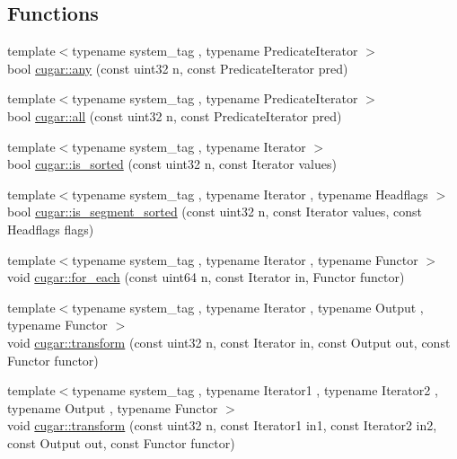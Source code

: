 \subsection*{Functions}
\begin{DoxyCompactItemize}
\item 
{\footnotesize template$<$typename system\+\_\+tag , typename Predicate\+Iterator $>$ }\\bool \hyperlink{group___primitives_ga71416af3e5407b31c78a10026520dbed}{cugar\+::any} (const uint32 n, const Predicate\+Iterator pred)
\item 
{\footnotesize template$<$typename system\+\_\+tag , typename Predicate\+Iterator $>$ }\\bool \hyperlink{group___primitives_gaa98aa06ec6a5f38dda15d74ce0c47d57}{cugar\+::all} (const uint32 n, const Predicate\+Iterator pred)
\item 
{\footnotesize template$<$typename system\+\_\+tag , typename Iterator $>$ }\\bool \hyperlink{group___primitives_gaec6f4aab196d418865686901c11a093c}{cugar\+::is\+\_\+sorted} (const uint32 n, const Iterator values)
\item 
{\footnotesize template$<$typename system\+\_\+tag , typename Iterator , typename Headflags $>$ }\\bool \hyperlink{group___primitives_ga5e6eb75d00ed617295bcee0b1db0ee3e}{cugar\+::is\+\_\+segment\+\_\+sorted} (const uint32 n, const Iterator values, const Headflags flags)
\item 
{\footnotesize template$<$typename system\+\_\+tag , typename Iterator , typename Functor $>$ }\\void \hyperlink{group___primitives_ga1e40de6d157d7b833f31f13a26a3bd04}{cugar\+::for\+\_\+each} (const uint64 n, const Iterator in, Functor functor)
\item 
{\footnotesize template$<$typename system\+\_\+tag , typename Iterator , typename Output , typename Functor $>$ }\\void \hyperlink{group___primitives_gab584ee91ed39f9b1fec5aa0e7a0284a4}{cugar\+::transform} (const uint32 n, const Iterator in, const Output out, const Functor functor)
\item 
{\footnotesize template$<$typename system\+\_\+tag , typename Iterator1 , typename Iterator2 , typename Output , typename Functor $>$ }\\void \hyperlink{group___primitives_ga2c0c3bba686f00f120c68465c28f5259}{cugar\+::transform} (const uint32 n, const Iterator1 in1, const Iterator2 in2, const Output out, const Functor functor)

\end{DoxyCompactItemize}
